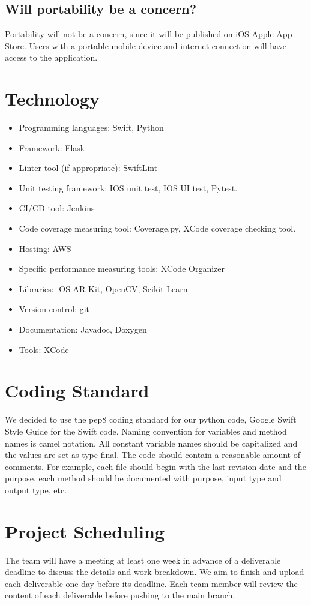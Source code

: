 \documentclass{article}
\begin{document}
\subsection{Will portability be a concern?}
Portability will not be a concern, since it will be published on iOS Apple App Store. Users with a portable mobile device and internet connection will have access to the application.

\section{Technology}

\begin{itemize}
\item Programming languages: Swift, Python
\item Framework: Flask
\item Linter tool (if appropriate): SwiftLint
\item Unit testing framework: IOS unit test, IOS UI test, Pytest.
\item CI/CD tool: Jenkins
\item Code coverage measuring tool: Coverage.py, XCode coverage checking tool.
\item Hosting: AWS
\item Specific performance measuring tools: XCode Organizer
\item Libraries: iOS AR Kit, OpenCV, Scikit-Learn
\item Version control: git
\item Documentation: Javadoc, Doxygen
\item Tools: XCode
\end{itemize}

\section{Coding Standard}

We decided to use the pep8 coding standard for our python code, Google Swift Style Guide for the Swift code. Naming convention for variables and method names is camel notation. All constant variable names should be capitalized and the values are set as type final. The code should contain a reasonable amount of comments. For example, each file should begin with the last revision date and the purpose, each method should be documented with purpose, input type and output type, etc.

\section{Project Scheduling}

The team will have a meeting at least one week in advance of a deliverable deadline to discuss the details and work breakdown. We aim to finish and upload each deliverable one day before its deadline. Each team member will review the content of each deliverable before pushing to the main branch.
\end{document}
